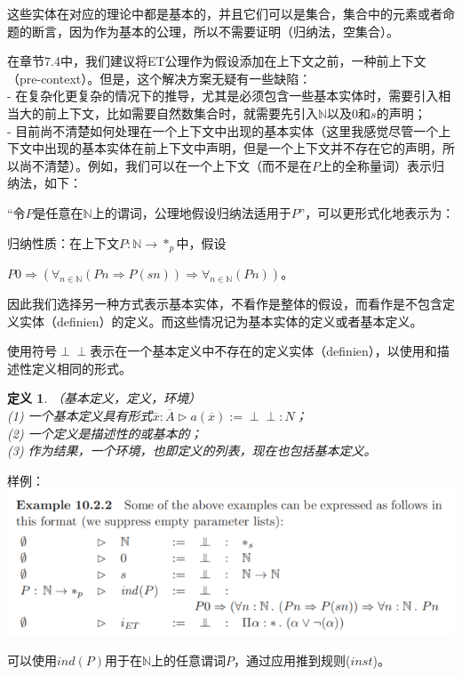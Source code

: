 \documentclass[UTF8]{article}
\newtheorem{thm}{定义}[section]
\newcommand{\dperp}{\perp\!\!\!\perp}
\begin{document}
		这些实体在对应的理论中都是基本的，并且它们可以是集合，集合中的元素或者命题的断言，因为作为基本的公理，所以不需要证明（归纳法，空集合）。
		
		在章节7.4中，我们建议将ET公理作为假设添加在上下文之前，一种前上下文（pre-context）。但是，这个解决方案无疑有一些缺陷：\\
		- 在复杂化更复杂的情况下的推导，尤其是必须包含一些基本实体时，需要引入相当大的前上下文，比如需要自然数集合时，就需要先引入$\mathbb{N}$以及0和$s$的声明；\\
		- 目前尚不清楚如何处理在一个上下文中出现的基本实体（这里我感觉尽管一个上下文中出现的基本实体在前上下文中声明，但是一个上下文并不存在它的声明，所以尚不清楚）。例如，我们可以在一个上下文（而不是在$P$上的全称量词）表示归纳法，如下：
		
		“令$P$是任意在$\mathbb{N}$上的谓词，公理地假设归纳法适用于$P$”，可以更形式化地表示为：
		
		归纳性质：在上下文$P:\mathbb{N}\rightarrow*_p$中，假设
		
		$P0\Rightarrow(\forall_{n\in\mathbb{N}}(Pn\Rightarrow P(sn))\Rightarrow\forall_{n\in\mathbb{N}}(Pn))$。
	
		因此我们选择另一种方式表示基本实体，不看作是整体的假设，而看作是不包含定义实体（definien）的定义。而这些情况记为基本实体的定义或者基本定义。
		
		使用符号$\dperp$表示在一个基本定义中不存在的定义实体（definien），以使用和描述性定义相同的形式。
		
		\begin{thm}（基本定义，定义，环境）\\
			(1) 一个基本定义具有形式$\overline{x}:\overline{A}\triangleright a(\overline{x}):=\dperp:N$；\\
			(2) 一个定义是描述性的或基本的；\\
			(3) 作为结果，一个环境，也即定义的列表，现在也包括基本定义。
		\end{thm}
	
		样例：\\
		\includegraphics[width=0.93\linewidth]{"../imgs/10-1.png"}
		
		可以使用$ind(P)$用于在$\mathbb{N}$上的任意谓词$P$，通过应用推到规则($inst$)。
		
\end{document}
